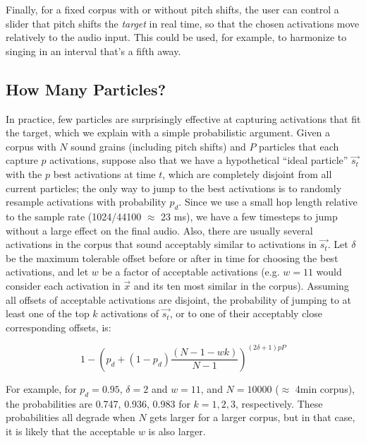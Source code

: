 \documentclass{article}
\begin{document}
Finally, for a fixed corpus with or without pitch shifts, the user can control a slider that pitch shifts the {\em target} in real time, so that the chosen activations move relatively to the audio input.  This could be used, for example, to harmonize to singing in an interval that's a fifth away.

\subsection{How Many Particles?}
\label{sec:howmanyparticles}
In practice, few particles are surprisingly effective at capturing activations that fit the target, which we explain with a simple probabilistic argument.  Given a corpus with $N$ sound grains (including pitch shifts) and $P$ particles that each capture $p$ activations, suppose also that we have a hypothetical ``ideal particle'' $\vec{s_t}$ with the $p$ best activations at time $t$, which are completely disjoint from all current particles; the only way to jump to the best activations is to randomly resample activations with probability $p_d$.  Since we use a small hop length relative to the sample rate (1024/44100 $\approx$ 23 ms), we have a few timesteps to jump without a large effect on the final audio.  Also, there are usually several activations in the corpus that sound acceptably similar to activations in $\vec{s_t}$.  Let $\delta$ be the maximum tolerable offset before or after in time for choosing the best activations, and let $w$ be a factor of acceptable activations (e.g. $w=11$ would consider each activation in $\vec{x}$ and its ten most similar in the corpus).  Assuming all offsets of acceptable activations are disjoint, the probability of jumping to at least one of the top $k$ activations of $\vec{s_{t}}$, or to one of their acceptably close corresponding offsets, is:

\begin{equation}
    \label{eq:timeadjacentprobmodified}
    1 - \left( p_d + (1-p_d) \frac{(N-1-wk)}{N-1} \right)^{(2 \delta +1)pP}
\end{equation}

For example, for $p_d = 0.95$, $\delta=2$ and $w = 11$, and $N=10000$ ($\approx$ 4min corpus), the probabilities are 0.747, 0.936, 0.983 for $k=1, 2, 3$, respectively.  These probabilities all degrade when $N$ gets larger for a larger corpus, but in that case, it is likely that the acceptable $w$ is also larger.
\end{document}
